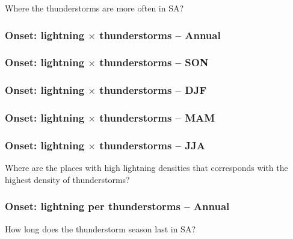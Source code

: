 \documentclass[smaller]{beamer}
\begin{document}
\begin{frame}
\Large
Where the thunderstorms are more often in SA?
\end{frame}

\begin{frame}
\frametitle{Onset: lightning $\times$ thunderstorms -- Annual}

\end{frame}


\begin{frame}
\frametitle{Onset: lightning $\times$ thunderstorms -- SON}

\end{frame}


\begin{frame}
\frametitle{Onset: lightning $\times$ thunderstorms -- DJF}

\end{frame}

\begin{frame}
\frametitle{Onset: lightning $\times$ thunderstorms -- MAM}

\end{frame}

\begin{frame}
\frametitle{Onset: lightning $\times$ thunderstorms -- JJA}

\end{frame}




\begin{frame}
\Large
Where are the places with high lightning densities that corresponds with the highest density of thunderstorms?
\end{frame}

\begin{frame}
\frametitle{Onset: lightning per thunderstorms -- Annual}

\end{frame}



\begin{frame}
\Large
How long does the thunderstorm season last in SA?
\end{frame}
\end{document}
